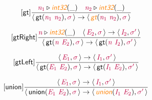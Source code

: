 \documentclass[10pt,leqno,fleqn]{article}
\newcommand{\artVariable}[1]{\mbox{\color{purple}\em #1\/}}
\newcommand{\artConstructor}[1]{\mbox{\sf #1}}
\newcommand{\artSpecial}[1]{\mbox{\color{orange}\sf\em #1}}
\begin{document}
\begin{equation}
\tag*{[\artConstructor{\sf gt}]}
\begin{split}\frac{ \artVariable{n$_{1}$}\triangleright \artSpecial{int32}(\_) \quad  \artVariable{n$_{2}$}\triangleright \artSpecial{int32}(\_) }{\langle\, \artConstructor{\sf gt}(\artVariable{n$_{1}$}\ \artVariable{n$_{2}$}), \artVariable{$\sigma$}\,\rangle \rightarrow \langle\, \artSpecial{gt}(\artVariable{n$_{1}$}\ \artVariable{n$_{2}$}), \artVariable{$\sigma$}\,\rangle }
\end{split}
\end{equation}

\begin{equation}
\tag*{[\artConstructor{\sf gtRight}]}
\begin{split}\frac{ \artVariable{n}\triangleright \artSpecial{int32}(\_) \quad \langle\, \artVariable{E$_{2}$}, \artVariable{$\sigma$}\,\rangle \rightarrow \langle\, \artVariable{I$_{2}$}, \artVariable{$\sigma$\/$^\prime$}\,\rangle }{\langle\, \artConstructor{\sf gt}(\artVariable{n}\ \artVariable{E$_{2}$}), \artVariable{$\sigma$}\,\rangle \rightarrow \langle\, \artConstructor{\sf gt}(\artVariable{n}\ \artVariable{I$_{2}$}), \artVariable{$\sigma$\/$^\prime$}\,\rangle }
\end{split}
\end{equation}

\begin{equation}
\tag*{[\artConstructor{\sf gtLeft}]}
\begin{split}\frac{\langle\, \artVariable{E$_{1}$}, \artVariable{$\sigma$}\,\rangle \rightarrow \langle\, \artVariable{I$_{1}$}, \artVariable{$\sigma$\/$^\prime$}\,\rangle }{\langle\, \artConstructor{\sf gt}(\artVariable{E$_{1}$}\ \artVariable{E$_{2}$}), \artVariable{$\sigma$}\,\rangle \rightarrow \langle\, \artConstructor{\sf gt}(\artVariable{I$_{1}$}\ \artVariable{E$_{2}$}), \artVariable{$\sigma$\/$^\prime$}\,\rangle }
\end{split}
\end{equation}

\begin{equation}
\tag*{[\artConstructor{\sf union}]}
\begin{split}\frac{\langle\, \artVariable{E$_{1}$}, \artVariable{$\sigma$}\,\rangle \rightarrow \langle\, \artVariable{I$_{1}$}, \artVariable{$\sigma$\/$^\prime$}\,\rangle }{\langle\, \artConstructor{\sf union}(\artVariable{E$_{1}$}\ \artVariable{E$_{2}$}), \artVariable{$\sigma$}\,\rangle \rightarrow \langle\, \artSpecial{union}(\artVariable{I$_{1}$}\ \artVariable{E$_{2}$}), \artVariable{$\sigma$\/$^\prime$}\,\rangle }
\end{split}
\end{equation}
\end{document}

